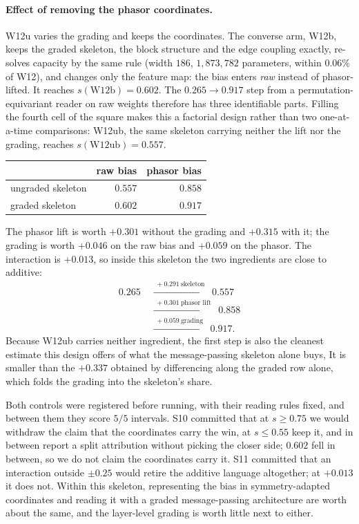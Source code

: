 \paragraph{Effect of removing the phasor coordinates.} W12u varies the
grading and keeps the coordinates. The converse arm, W12b, keeps the graded skeleton, the block
structure and the edge coupling exactly, re-solves capacity by the same rule (width $186$,
$1{,}873{,}782$ parameters, within $0.06\%$ of W12), and changes only the feature map: the bias
enters \emph{raw} instead of phasor-lifted. It reaches $s(\mathrm{W12b}) = \mathbf{0.602}$. The
$0.265 \to 0.917$ step from a permutation-equivariant reader on raw weights therefore has three
identifiable parts. Filling the fourth cell of the square makes this a factorial design rather than
two one-at-a-time comparisons: W12ub, the same skeleton carrying neither the lift nor the grading,
reaches $s(\mathrm{W12ub}) = \mathbf{0.557}$.

\begin{center}\small
\begin{tabular}{@{}lrr@{}}
\toprule
 & raw bias & phasor bias \\
\midrule
ungraded skeleton & $0.557$ & $0.858$ \\
graded skeleton   & $0.602$ & $0.917$ \\
\bottomrule
\end{tabular}
\end{center}

\noindent The phasor lift is worth $+0.301$ without the grading and $+0.315$ with it; the grading is
worth $+0.046$ on the raw bias and $+0.059$ on the phasor. The interaction is $\mathbf{+0.013}$, so
inside this skeleton the two ingredients are close to additive:
\[
\begin{aligned}
0.265 &\;\xrightarrow{\;+0.291\ \text{skeleton}\;}\; 0.557\\
&\;\xrightarrow{\;+0.301\ \text{phasor lift}\;}\; 0.858\\
&\;\xrightarrow{\;+0.059\ \text{grading}\;}\; 0.917 .
\end{aligned}
\]
Because W12ub carries neither ingredient, the first step is also the cleanest estimate this design
offers of what the message-passing skeleton alone buys, It is smaller than the $+0.337$ obtained by differencing
along the graded row alone, which folds the grading into the skeleton's share.

Both controls were registered before running, with their reading rules fixed, and between them they
score $5/5$ intervals. S10 committed that at $s \ge 0.75$ we would withdraw the claim that the
coordinates carry the win, at $s \le 0.55$ keep it, and in between report a split attribution
without picking the closer side; $0.602$ fell in between, so we do not claim the coordinates carry
it. S11 committed that an interaction outside $\pm0.25$ would retire the additive language
altogether; at $+0.013$ it does not. Within this skeleton, representing the bias in
symmetry-adapted coordinates and reading it with a graded message-passing architecture are worth
about the same, and the layer-level grading is worth little next to either.

